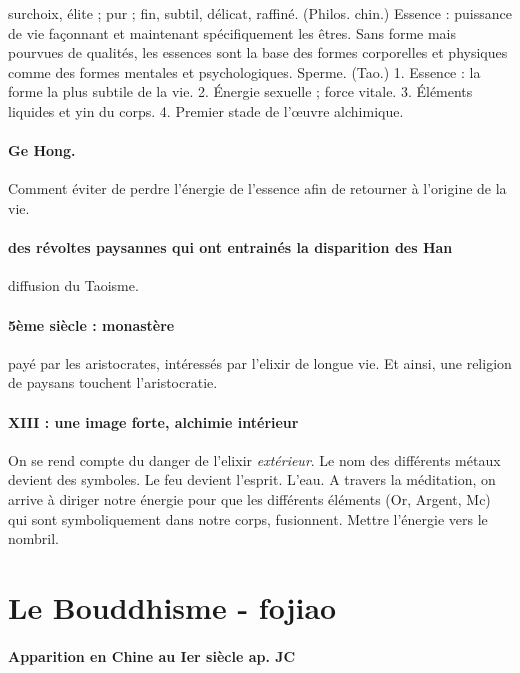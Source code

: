 \begin{Def}[jing 精]
    surchoix, élite ; pur ; fin, subtil, délicat, raffiné. (Philos. chin.) Essence : puissance de vie façonnant et maintenant spécifiquement les êtres. Sans forme mais pourvues de qualités, les essences sont la base des formes corporelles et physiques comme des formes mentales et psychologiques. Sperme. (Tao.) 1. Essence : la forme la plus subtile de la vie. 2. Énergie sexuelle ; force vitale. 3. Éléments liquides et yin du corps. 4. Premier stade de l’œuvre alchimique. 
\end{Def}

\paragraph{Ge Hong. } Comment éviter de perdre l'énergie de l'essence afin de retourner à l'origine de la vie. 

\paragraph{des révoltes paysannes qui ont entrainés la disparition des Han} diffusion du Taoisme. 


\paragraph{5ème siècle : monastère} payé par les aristocrates, intéressés par l'elixir de longue vie. Et ainsi, une religion de paysans touchent l'aristocratie. 

\paragraph{XIII : une image forte, alchimie intérieur} On se rend compte du danger de l'elixir \textit{extérieur}. Le nom des différents métaux devient des symboles. Le feu devient l'esprit. L'eau. A travers la méditation, on arrive à diriger notre énergie pour que les différents éléments (Or, Argent, Mc) qui sont symboliquement dans notre corps, fusionnent. Mettre l'énergie vers le nombril.



\section{Le Bouddhisme - fojiao}

\paragraph{Apparition en Chine au Ier siècle ap. JC}


